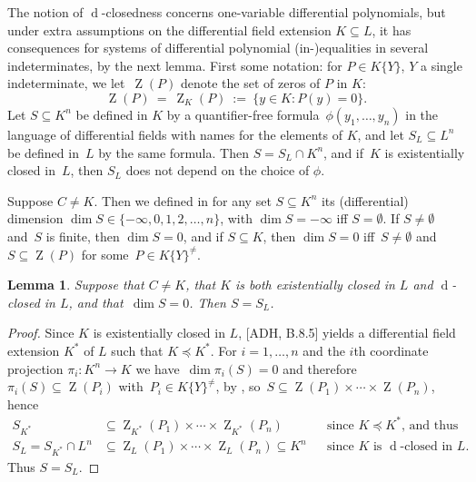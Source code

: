 \documentclass[]{amsart}
\numberwithin{equation}{section}
\def \d{\operatorname{d}}
\newtheorem{lemma}[theorem]{Lemma}
\theoremstyle{definition}
\theoremstyle{remark}
\def \Zero{\operatorname{Z}}
\renewcommand\preceq{\preccurlyeq}
\begin{document}
\noindent
The notion of $\d$-closedness concerns one-variable differential polynomials, but under extra assumptions on the
differential field extension $K\subseteq L$, it has consequences for systems of differential polynomial (in-)equalities in several indeterminates, by the next lemma. First some notation: for $P\in K\{Y\}$, $Y$ a single indeterminate, we let~$\Zero(P)$ denote the set of zeros of $P$ in $K$:
$$\Zero(P)\ =\ \Zero_K(P)\  :=\  \big\{y\in K: P(y)=0\big\}.$$
Let $S\subseteq K^n$ be defined in $K$ by a quantifier-free formula~$\phi(y_1,\dots,y_n)$
in the language of differential fields with names for the elements of $K$, and let 
$S_L\subseteq L^n$ be defined
in~$L$ by the same formula. Then $S=S_L\cap K^n$, and
if~$K$ is existentially closed in~$L$, then $S_L$ does not depend on the choice of $\phi$.  

Suppose $C\ne K$. Then we defined in \cite[Section~1]{ADHdim}
for any set $S\subseteq K^n$ its (differential) dimension $\dim S\in \{-\infty, 0,1,2,\dots,n\}$, with $\dim S=-\infty$ iff $S=\emptyset$. 
If $S\ne\emptyset$ and~$S$ is finite, then $\dim S=0$, and if $S\subseteq K$, then $\dim S=0$
iff~$S\ne\emptyset$ and~$S\subseteq \Zero(P)$ for some~${P\in K\{Y\}^{\ne}}$.

\begin{lemma}\label{lem:dim0}
Suppose that $C\ne K$, that $K$ is both existentially closed in $L$
and $\d$-closed in $L$, and that~$\dim S=0$. Then $S=S_L$.
\end{lemma}
\begin{proof}
Since $K$ is existentially closed in $L$,   [ADH, B.8.5] yields a differential field  extension $K^*$ of $L$ such that $K\preceq K^*$. 
For $i=1,\dots,n$ and the $i$th coordinate projection $\pi_i\colon K^n\to K$ we have~$\dim \pi_i(S)=0$
and therefore $\pi_i(S)\subseteq\Zero(P_i)$ with~$P_i\in K\{Y\}^{\ne}$, by \cite[Lemma~1.2]{ADHdim}, so~$S\subseteq\Zero(P_1)\times\cdots\times\Zero(P_n)$, hence 
\begin{align*}
S_{K^*}&\subseteq \Zero_{K^*}(P_1)\times\cdots\times\Zero_{K^*}(P_n)&&\text{since $K\preceq K^*$, and thus} \\
S_L=S_{K^*}\cap L^n&\subseteq \Zero_{L}(P_1)\times\cdots\times\Zero_{L}(P_n)\subseteq K^n&&\text{since~$K$ is $\d$-closed in $L$.}
\end{align*}
Thus $S=S_L$.
\end{proof}
\end{document}
